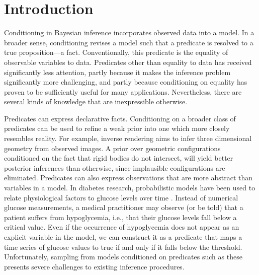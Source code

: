 
\section{Introduction}

Conditioning in Bayesian inference incorporates observed data into a model.
In a broader sense, conditioning revises a model such that a predicate is resolved to a true proposition---a fact.
Conventionally, this predicate is the equality of observable variables to data.
Predicates other than equality to data has received significantly less attention, partly because it makes the inference problem significantly more challenging, and partly because conditioning on equality has proven to be sufficiently useful for many applications.
Nevertheless, there are several kinds of knowledge that are inexpressible otherwise.

Predicates can express declarative facts.
Conditioning on a broader class of predicates can be used to refine a weak prior into one which more closely resembles reality.
For example, inverse rendering  \cite{marschner1998inverse,kulkarni2015deep} aims to infer three dimensional geometry from observed images.
A prior over geometric configurations conditioned on the fact that rigid bodies do not intersect,  will yield better posterior inferences than otherwise, since implausible configurations are eliminated.
Predicates can also express observations that are more abstract than variables in a model.
In diabetes research, probabilistic models have been used to relate physiological factors to glucose levels over time \citep{levine2017offline,murata2004probabilistic}.
Instead of numerical glucose measurements, a medical practitioner may observe (or be told) that a patient suffers from hypoglycemia, i.e., that their glucose levels fall below a critical value.
Even if the occurrence of hypoglycemia does not appear as an explicit variable in the model, we can construct it as a predicate that maps a time series of glucose values to true if and only if it falls below the threshold.
Unfortunately, sampling from models conditioned on predicates such as these presents severe challenges to existing inference procedures.


